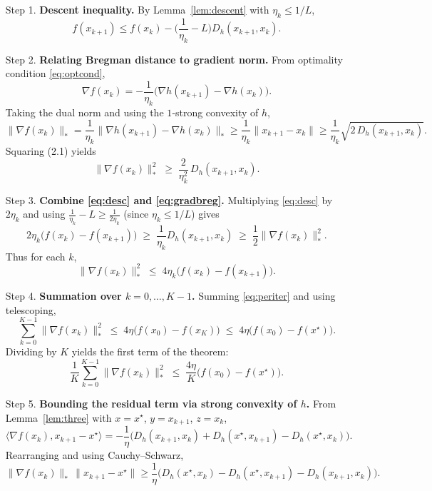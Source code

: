 \documentclass{article}
\newcommand{\breg}[2]{D_h(#1,#2)}
\begin{document}
\begin{enumerate}
\item[Step 1.] \textbf{Descent inequality.}  
By Lemma~\ref{lem:descent} with $\eta_k\le 1/L$,
\begin{equation}\label{eq:desc}
f(x_{k+1})\le f(x_k)-\Big(\frac{1}{\eta_k}-L\Big)\breg{x_{k+1}}{x_k}.
\end{equation}
\item[Step 2.] \textbf{Relating Bregman distance to gradient norm.}  
From optimality condition \eqref{eq:optcond},
\[
\nabla f(x_k)= -\frac{1}{\eta_k}\big(\nabla h(x_{k+1})-\nabla h(x_k)\big).
\]
Taking the dual norm and using the $1$‑strong convexity of $h$,
\[
\|\nabla f(x_k)\|_{*}
= \frac{1}{\eta_k}\big\|\nabla h(x_{k+1})-\nabla h(x_k)\big\|_{*}
\ge \frac{1}{\eta_k}\|x_{k+1}-x_k\|
\ge \frac{1}{\eta_k}\sqrt{2\,\breg{x_{k+1}}{x_k}}.
\tag{2.1}
\]
Squaring (2.1) yields
\begin{equation}\label{eq:gradbreg}
\|\nabla f(x_k)\|_{*}^{2}\;\ge\;\frac{2}{\eta_k^{2}}\,\breg{x_{k+1}}{x_k}.
\end{equation}
\item[Step 3.] \textbf{Combine \eqref{eq:desc} and \eqref{eq:gradbreg}.}  
Multiplying \eqref{eq:desc} by $2\eta_k$ and using $\frac{1}{\eta_k}-L\ge \frac{1}{2\eta_k}$ (since $\eta_k\le 1/L$) gives
\[
2\eta_k\big(f(x_k)-f(x_{k+1})\big)
\;\ge\;
\frac{1}{\eta_k}\breg{x_{k+1}}{x_k}
\;\ge\;
\frac{1}{2}\|\nabla f(x_k)\|_{*}^{2}.
\tag{3.1}
\]
Thus for each $k$,
\begin{equation}\label{eq:periter}
\|\nabla f(x_k)\|_{*}^{2}
\;\le\;
4\eta_k\big(f(x_k)-f(x_{k+1})\big).
\end{equation}
\item[Step 4.] \textbf{Summation over $k=0,\dots,K-1$.}  
Summing \eqref{eq:periter} and using telescoping,
\[
\sum_{k=0}^{K-1}\|\nabla f(x_k)\|_{*}^{2}
\;\le\;
4\eta\big(f(x_0)-f(x_K)\big)
\;\le\;
4\eta\big(f(x_0)-f(x^\star)\big).
\tag{4.1}
\]
Dividing by $K$ yields the first term of the theorem:
\[
\frac{1}{K}\sum_{k=0}^{K-1}\|\nabla f(x_k)\|_{*}^{2}
\;\le\;
\frac{4\eta}{K}\big(f(x_0)-f(x^\star)\big).
\]
\item[Step 5.] \textbf{Bounding the residual term via strong convexity of $h$.}  
From Lemma~\ref{lem:three} with $x=x^\star$, $y=x_{k+1}$, $z=x_k$,
\[
\langle\nabla f(x_k),x_{k+1}-x^\star\rangle
= -\frac{1}{\eta}\big(\breg{x_{k+1}}{x_k}+\breg{x^\star}{x_{k+1}}-\breg{x^\star}{x_k}\big).
\]
Rearranging and using Cauchy–Schwarz,
\[
\|\nabla f(x_k)\|_{*}\,\|x_{k+1}-x^\star\|
\ge
\frac{1}{\eta}\big(\breg{x^\star}{x_k}-\breg{x^\star}{x_{k+1}}-\breg{x_{k+1}}{x_k}\big).
\]
\end{enumerate}
\end{document}
